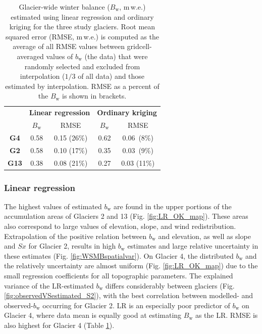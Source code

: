 \documentclass[twocolumn, letterpaper]{igs}
\begin{document}
\begin{table}[]
\centering
\caption{Glacier-wide winter balance ($B_\mathrm{w}$, m\,w.e.) estimated using linear regression and ordinary kriging for the three study glaciers. Root mean squared error (RMSE, m\,w.e.) is computed as the average of all RMSE values between gridcell-averaged values of $b_\mathrm{w}$ (the data) that were randomly selected and excluded from interpolation ($1/3$ of all data) and those estimated by interpolation. RMSE as a percent of the $B_\mathrm{w}$ is shown in brackets.}
\label{tab:WSMB&RMSE}
\begin{tabular}{c|cc|cc}
 & \multicolumn{2}{c|}{\textbf{Linear regression}} & \multicolumn{2}{c}{\textbf{Ordinary kriging}} \\
 & $B_\mathrm{w}$ & RMSE & $B_\mathrm{w}$ & RMSE \\ \hline
\textbf{G4} & 0.58 & 0.15 (26\%) & 0.62 & 0.06 \,(8\%) \\
\textbf{G2} & 0.58 & 0.10 (17\%) & 0.35 & 0.03 \,(9\%) \\
\textbf{G13} & 0.38 & 0.08 (21\%) & 0.27 & 0.03 (11\%)
\end{tabular}
\end{table}

\subsubsection{Linear regression}

The highest values of estimated $b_\mathrm{w}$ are found in the upper portions of the accumulation areas of Glaciers 2 and 13 (Fig. \ref{fig:LR_OK_map}). These areas also correspond to large values of elevation, slope, and wind redistribution. Extrapolation of the positive relation between $b_\mathrm{w}$ and elevation, as well as slope and $Sx$ for Glacier 2, results in high $b_\mathrm{w}$ estimates and large relative uncertainty in these estimates (Fig. \ref{fig:WSMBspatialvar}). On Glacier 4, the distributed $b_\mathrm{w}$ and the relatively uncertainty are almost uniform (Fig. \ref{fig:LR_OK_map}) due to the small regression coefficients for all topographic parameters. The explained variance of the LR-estimated $b_\mathrm{w}$ differs considerably between glaciers (Fig. \ref{fig:observedVSestimated_S2}), with the best correlation between modelled- and observed-$b_\mathrm{w}$ occurring for Glacier 2. LR is an especially poor predictor of $b_\mathrm{w}$ on Glacier 4, where data mean is equally good at estimating $B_\mathrm{w}$ as the LR. RMSE is also highest for Glacier 4 (Table \ref{tab:WSMB&RMSE}). 
\end{document}
